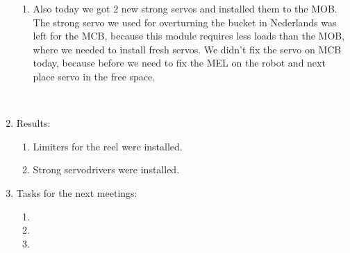 \begin{enumerate}
\begin{enumerate}
		\item Also today we got 2 new strong servos and installed them to the MOB. The strong servo we used for overturning the bucket in Nederlands was left for the MCB, because this module requires less loads than the MOB, where we needed to install fresh servos. We didn't fix the servo on MCB today, because before we need to fix the MEL on the robot and next place servo in the free space.
		\begin{figure}[H]
			\begin{minipage}[h]{0.2\linewidth}
				\center  
			\end{minipage}
			\begin{minipage}[h]{0.6\linewidth}
				\caption{}
			\end{minipage}
		\end{figure}
		
	\end{enumerate}
	
	\item Results:
	\begin{enumerate}
		
		\item Limiters for the reel were installed.
		
		\item Strong servodrivers were installed.
		
	\end{enumerate}
	
	\item Tasks for the next meetings:
	\begin{enumerate}
		
		\item 
		
		\item 
		
        \item 
			
	\end{enumerate}
\end{enumerate}
\fillpage
